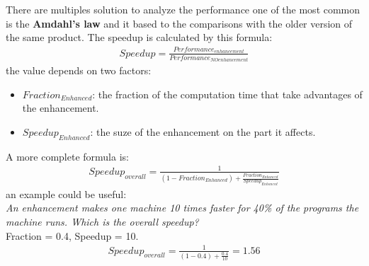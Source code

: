 \documentclass[12pt]{article}
\begin{document}
There are multiples solution to analyze the performance one of the most common is the \textbf{Amdahl's law} and it based to the comparisons with the older version of the same product. The speedup is calculated by this formula:
\begin{equation}
  \begin{gathered}
    Speedup = \frac{Performance_{enhancement}}{Performance_{NOenhancement}}
    \label{eq:tsoglie}
  \end{gathered}
\end{equation}
the value depends on two factors:
\begin{itemize}
  \item $Fraction_{Enhanced}$: the fraction of the computation time that take advantages of the enhancement.
  \item $Speedup_{Enhanced}$: the suze of the enhancement on the part it affects.
\end{itemize}
A more complete formula is:
\begin{equation}
  \begin{gathered}
    Speedup_{overall} = \frac{1}{(1-Fraction_{Enhanced}) + \frac{Fraction_{Enhanced}}{Speedup_{Enhanced}}}
    \label{eq:tsoglie}
  \end{gathered}
\end{equation}
an example could be useful:\\

\textit{An enhancement makes one machine 10 times faster for 40\% of the programs the machine runs. Which is the overall speedup?}\\
Fraction = 0.4, Speedup = 10.
\begin{equation}
  \begin{gathered}
    Speedup_{overall} = \frac{1}{(1-0.4) + \frac{0.4}{10}} = 1.56
    \label{eq:tsoglie}
  \end{gathered}
\end{equation}
\end{document}
